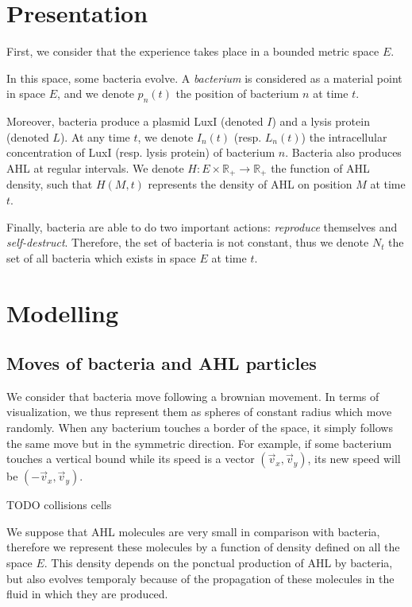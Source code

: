 \documentclass[a4paper]{article}
\theoremstyle{definition}
\begin{document}
\section{Presentation}

First, we consider that the experience takes place in a bounded metric space $E$.

In this space, some bacteria evolve. A \emph{bacterium} is considered as a material point in space $E$, and we denote $p_n(t)$ the position of bacterium $n$ at time $t$.

Moreover, bacteria produce a plasmid LuxI (denoted $I$) and a lysis protein (denoted $L$). At any time $t$, we denote $I_n(t)$ (resp. $L_n(t)$) the intracellular concentration of LuxI (resp. lysis protein) of bacterium $n$. Bacteria also produces AHL at regular intervals. We denote $H : E \times \mathbb{R}_+ \to \mathbb{R}_+$ the function of AHL density, such that $H(M,t)$ represents the density of AHL on position $M$ at time $t$.

Finally, bacteria are able to do two important actions: \emph{reproduce} themselves and \emph{self-destruct}. Therefore, the set of bacteria is not constant, thus we denote $N_t$ the set of all bacteria which exists in space $E$ at time $t$.

\section{Modelling}

\subsection{Moves of bacteria and AHL particles}

We consider that bacteria move following a brownian movement. In terms of visualization, we thus represent them as spheres of constant radius which move randomly. When any bacterium touches a border of the space, it simply follows the same move but in the symmetric direction. For example, if some bacterium touches a vertical bound while its speed is a vector $(\vec{v}_x, \vec{v}_y)$, its new speed will be $(-\vec{v}_x, \vec{v}_y)$.

TODO collisions cells

We suppose that AHL molecules are very small in comparison with bacteria, therefore we represent these molecules by a function of density defined on all the space $E$. This density depends on the ponctual production of AHL by bacteria, but also evolves temporaly because of the propagation of these molecules in the fluid in which they are produced.
\end{document}
